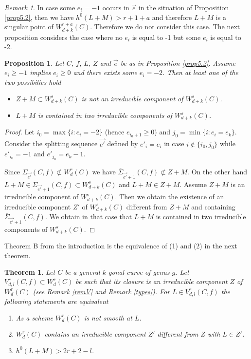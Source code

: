 \documentclass{article}
\newtheorem{theorem}{Theorem}
\newtheorem{proposition}{Proposition}
\theoremstyle{definition}
\theoremstyle{remark}
\newtheorem{remark}{Remark}
\begin{document}
\begin{remark}\label{rem5.1}
In case some $e_i=-1$ occurs in $\overrightarrow {e}$ in the situation of Proposition \ref{prop5.2}, then we have $h^0(L+M)>r+1+a$ and therefore $L+M$ is a singular point of $W^{r+a}_{d+k}(C)$.
Therefore we do not consider this case.
The next proposition considers the case where no $e_i$ is equal to -1 but some $e_i$ is equal to -2.
\end{remark}

\begin{proposition}\label{prop5.3}
Let $C$, $f$, $L$, $Z$ and $\overrightarrow {e}$ be as in Proposition \ref{prop5.2}.
Assume $e_i \geq -1$ implies $e_i \geq 0$ and there exists some $e_i=-2$.
Then at least one of the two possibilies hold
\begin{itemize}
\item $Z+M \subset W^s_{d+k}(C)$ is not an irreducible component of $W^s_{d+k}(C)$.
\item $L+M$ is contained in two irreducible components of $W^s_{d+k}(C)$.
\end{itemize}
\end{proposition}

\begin{proof}
Let $i_0 = \max \{i: e_i=-2 \}$ (hence $e_{i_0+1} \geq 0$) and $j_0= \min \{ i : e_i=e_k \}$.
Consider the splitting sequence $\overrightarrow {e'}$ defined by $e'_i=e_i$ in case $i \notin \{ i_0,j_0 \}$ while $e'_{i_0}=-1$ and $e'_{j_0} = e_k-1$.

Since $\Sigma _{\overrightarrow {e'}}(C,f) \not\subset W^r_d(C)$ we have $\overline{\Sigma}_{\overrightarrow {e'}+1}(C,f) \not\subset Z+M$.
On the other hand $L+M \in \overline{\Sigma}_{\overrightarrow {e'}+1}(C,f) \subset W^s_{d+k}(C)$ and $L+M \in Z+M$.
Assume $Z+M$ is an irreducible component of $W^s_{d+k}(C)$.
Then we obtain the existence of an irreducible component $Z'$ of $W^s_{d+k}(C)$ different from $Z+M$ and containing $\overline{\Sigma}_{\overrightarrow {e'}+1}(C,f)$.
We obtain in that case that $L+M$ is contained in two irreducible components of $W^s_{d+k}(C)$.
\end{proof}

Theorem B from the introduction is the equivalence of (1) and (2) in the next theorem.
\begin{theorem}\label{theorem5.1}
Let $C$ be a general $k$-gonal curve of genus $g$.
Let $V^r_{d,l}(C,f) \subset W^r_d(C)$ be such that its closure is an irreducible component $Z$ of $W^r_d(C)$ (see Remark \ref{remV} and Remark \ref{types}).
For $L \in V^r_{d,l}(C,f)$ the following statements are equivalent
\begin{enumerate}
\item As a scheme $W^r_d(C)$ is not smooth at $L$.
\item $W^r_d(C)$ contains an irreducible component $Z'$ different from $Z$ with $L \in Z'$.
\item $h^0(L+M)>2r+2-l$.
\end{enumerate}
\end{theorem}
\end{document}
